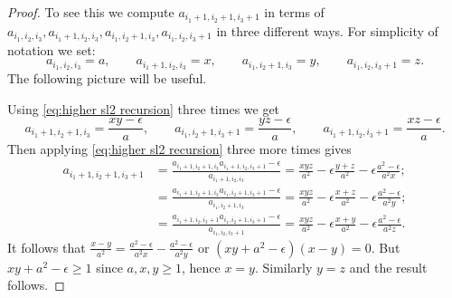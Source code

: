 \documentclass{amsart}
\begin{document}
    \begin{proof}
      To see this we compute $a_{i_1+1,i_2+1,i_3+1}$ in terms of $a_{i_1,i_2,i_3}, a_{i_1+1,i_2,i_3}, a_{i_1,i_2+1,i_3}, a_{i_1,i_2,i_3+1}$ in three different ways.  For simplicity of notation we set:
      \[a_{i_1,i_2,i_3}=a,\quad\quad a_{i_1+1,i_2,i_3}=x,\quad\quad a_{i_1,i_2+1,i_3}=y,\quad\quad a_{i_1,i_2,i_3+1}=z.\]
      The following picture will be useful.
      \begin{center} 
      \end{center}
      Using \eqref{eq:higher sl2 recursion} three times we get
      \[a_{i_1+1,i_2+1,i_3}=\frac{xy-\epsilon}{a},\quad\quad a_{i_1,i_2+1,i_3+1}=\frac{yz-\epsilon}{a},\quad\quad a_{i_1+1,i_2,i_3+1}=\frac{xz-\epsilon}{a}.\]
      Then applying \eqref{eq:higher sl2 recursion} three more times gives
      \begin{align*}
        a_{i_1+1,i_2+1,i_3+1} 
        &= \frac{a_{i_1+1,i_2+1,i_3}a_{i_1+1,i_2,i_3+1}-\epsilon}{a_{i_1+1,i_2,i_3}}=\frac{xyz}{a^2}-\epsilon\frac{y+z}{a^2}-\epsilon\frac{a^2-\epsilon}{a^2x};\\
        &= \frac{a_{i_1+1,i_2+1,i_3}a_{i_1,i_2+1,i_3+1}-\epsilon}{a_{i_1,i_2+1,i_3}}=\frac{xyz}{a^2}-\epsilon\frac{x+z}{a^2}-\epsilon\frac{a^2-\epsilon}{a^2y};\\
        &= \frac{a_{i_1+1,i_2,i_3+1}a_{i_1,i_2+1,i_3+1}-\epsilon}{a_{i_1,i_2,i_3+1}}=\frac{xyz}{a^2}-\epsilon\frac{x+y}{a^2}-\epsilon\frac{a^2-\epsilon}{a^2z}.
      \end{align*}
      It follows that $\frac{x-y}{a^2}=\frac{a^2-\epsilon}{a^2x}-\frac{a^2-\epsilon}{a^2y}$ or $(xy+a^2-\epsilon)(x-y)=0$.  But $xy+a^2-\epsilon\ge1$ since $a,x,y\ge1$, hence $x=y$.  Similarly $y=z$ and the result follows.
    \end{proof}
    
\end{document}
